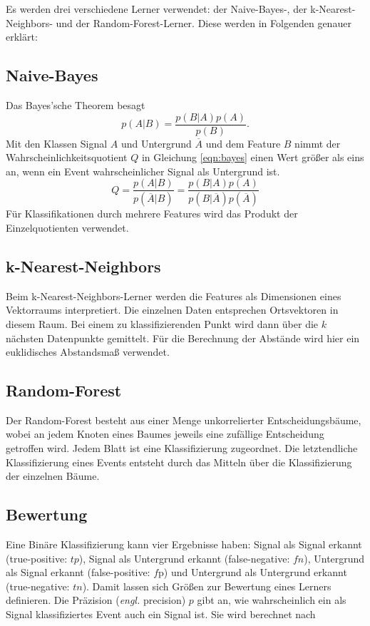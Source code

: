 
Es werden drei verschiedene Lerner verwendet: der Naive-Bayes-, der  k-Nearest-Neighbors- und der Random-Forest-Lerner. Diese werden in Folgenden genauer erklärt:

\subsection{Naive-Bayes}
Das Bayes'sche Theorem besagt
\begin{equation}
	p(A|B)=\frac{p(B|A)p(A)}{p(B)}.
\end{equation}
Mit den Klassen Signal $A$ und Untergrund $\overline{A}$ und dem Feature $B$ nimmt der Wahrscheinlichkeitsquotient $Q$ in Gleichung \eqref{eqn:bayes} einen Wert größer als
eins an, wenn ein Event wahrscheinlicher Signal als Untergrund ist.
\begin{equation}
	Q=\frac{p(A|B)}{p(\overline{A}|B)} = \frac{p(B|A)p(A)}{p(B|\overline{A})p(\overline{A})}
	\label{eqn:bayes}
\end{equation}
Für Klassifikationen durch mehrere Features wird das Produkt der Einzelquotienten verwendet.

\subsection{k-Nearest-Neighbors}
Beim k-Nearest-Neighbors-Lerner  werden die Features als Dimensionen eines Vektorraums interpretiert. Die einzelnen Daten entsprechen Ortsvektoren in diesem Raum. Bei einem zu
klassifizierenden Punkt wird dann über die $k$ nächsten Datenpunkte gemittelt. Für die Berechnung der Abstände wird hier ein euklidisches Abstandsmaß verwendet.


\subsection{Random-Forest}
Der Random-Forest besteht aus einer Menge unkorrelierter Entscheidungsbäume, wobei an jedem Knoten eines Baumes jeweils eine zufällige Entscheidung getroffen wird. Jedem Blatt ist eine Klassifizierung zugeordnet.
Die letztendliche Klassifizierung eines Events entsteht durch das Mitteln über die Klassifizierung der einzelnen Bäume.


\subsection{Bewertung}
Eine Binäre Klassifizierung kann vier Ergebnisse haben: Signal als Signal erkannt (true-positive: $tp$), Signal als Untergrund erkannt (false-negative: $fn$),
Untergrund als Signal erkannt (false-positive: $f$p) und Untergrund als Untergrund erkannt (true-negative: $tn$). Damit lassen sich Größen zur Bewertung eines
Lerners definieren. Die Präzision (\textit{engl.} precision) $p$ gibt an, wie wahrscheinlich ein als Signal klassifiziertes Event auch ein Signal ist. Sie wird berechnet nach

